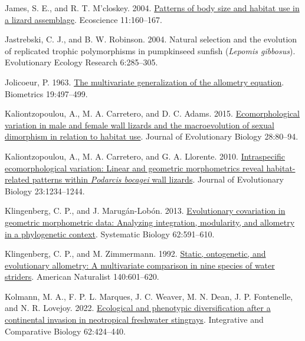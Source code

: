 \documentclass[
  11pt,
]{article}
\newlength{\cslhangindent}
\newlength{\cslentryspacingunit} %
\newenvironment{CSLReferences}[2] %
 {%
  \setlength{\parindent}{0pt}
  \ifodd #1
  \let\oldpar\par
  \def\par{\hangindent=\cslhangindent\oldpar}
  \fi
  \setlength{\parskip}{#2\cslentryspacingunit}
 }%
 {}
\begin{document}
\begin{CSLReferences}{1}{0}
\leavevmode{}%
James, S. E., and R. T. M'closkey. 2004.
\href{https://doi.org/10.1080/11956860.2004.11682820}{Patterns of body
size and habitat use in a lizard assemblage}. Ecoscience 11:160--167.

\leavevmode{}%
Jastrebski, C. J., and B. W. Robinson. 2004. Natural selection and the
evolution of replicated trophic polymorphisms in pumpkinseed sunfish
(\emph{{L}epomis gibbosus}). Evolutionary Ecology Research 6:285--305.

\leavevmode{}%
Jolicoeur, P. 1963. \href{https://doi.org/10.2307/2527939}{The
multivariate generalization of the allometry equation}. Biometrics
19:497--499.

\leavevmode{}%
Kaliontzopoulou, A., M. A. Carretero, and D. C. Adams. 2015.
\href{https://doi.org/10.1111/jeb.12540}{Ecomorphological variation in
male and female wall lizards and the macroevolution of sexual dimorphism
in relation to habitat use}. Journal of Evolutionary Biology 28:80--94.

\leavevmode{}%
Kaliontzopoulou, A., M. A. Carretero, and G. A. Llorente. 2010.
\href{https://doi.org/10.1111/j.1420-9101.2010.01984.x}{Intraspecific
ecomorphological variation: Linear and geometric morphometrics reveal
habitat-related patterns within \emph{{P}odarcis bocagei} wall lizards}.
Journal of Evolutionary Biology 23:1234--1244.

\leavevmode{}%
Klingenberg, C. P., and J. Marugán-Lobón. 2013.
\href{https://doi.org/10.1093/sysbio/syt025}{Evolutionary covariation in
geometric morphometric data: Analyzing integration, modularity, and
allometry in a phylogenetic context}. Systematic Biology 62:591--610.

\leavevmode{}%
Klingenberg, C. P., and M. Zimmermann. 1992.
\href{https://doi.org/10.1086/285430}{Static, ontogenetic, and
evolutionary allometry: A multivariate comparison in nine species of
water striders}. American Naturalist 140:601--620.

\leavevmode{}%
Kolmann, M. A., F. P. L. Marques, J. C. Weaver, M. N. Dean, J. P.
Fontenelle, and N. R. Lovejoy. 2022.
\href{https://doi.org/10.1093/icb/icac019}{Ecological and phenotypic
diversification after a continental invasion in neotropical freshwater
stingrays}. Integrative and Comparative Biology 62:424--440.


\end{CSLReferences}
\end{document}

